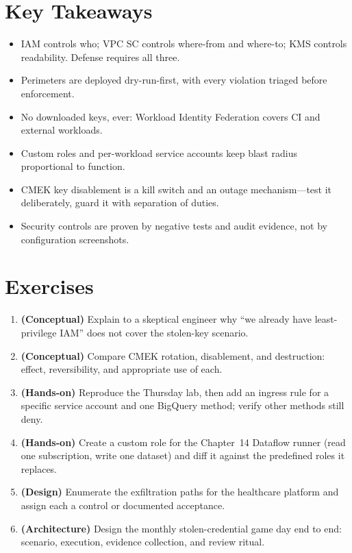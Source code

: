 \section*{Key Takeaways}
\begin{itemize}
    \item IAM controls who; VPC SC controls where-from and where-to; KMS controls readability. Defense requires all three.
    \item Perimeters are deployed dry-run-first, with every violation triaged before enforcement.
    \item No downloaded keys, ever: Workload Identity Federation covers CI and external workloads.
    \item Custom roles and per-workload service accounts keep blast radius proportional to function.
    \item CMEK key disablement is a kill switch and an outage mechanism---test it deliberately, guard it with separation of duties.
    \item Security controls are proven by negative tests and audit evidence, not by configuration screenshots.
\end{itemize}

\section{Exercises}
\begin{enumerate}
    \item \textbf{(Conceptual)} Explain to a skeptical engineer why ``we already have least-privilege IAM'' does not cover the stolen-key scenario.
    \item \textbf{(Conceptual)} Compare CMEK rotation, disablement, and destruction: effect, reversibility, and appropriate use of each.
    \item \textbf{(Hands-on)} Reproduce the Thursday lab, then add an ingress rule for a specific service account and one BigQuery method; verify other methods still deny.
    \item \textbf{(Hands-on)} Create a custom role for the Chapter~14 Dataflow runner (read one subscription, write one dataset) and diff it against the predefined roles it replaces.
    \item \textbf{(Design)} Enumerate the exfiltration paths for the healthcare platform and assign each a control or documented acceptance.
    \item \textbf{(Architecture)} Design the monthly stolen-credential game day end to end: scenario, execution, evidence collection, and review ritual.
\end{enumerate}
